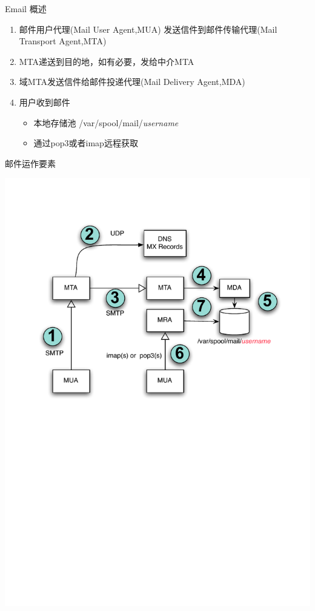 \begin{frame}{Email 概述}
\begin{enumerate}
\item 邮件用户代理(Mail User Agent,MUA) 发送信件到邮件传输代理(Mail Transport Agent,MTA)
\item MTA递送到目的地，如有必要，发给中介MTA
\item 域MTA发送信件给邮件投递代理(Mail Delivery Agent,MDA)
\item 用户收到邮件

\begin{itemize}
\item 本地存储池 /var/spool/mail/\emph{username}
\item 通过pop3或者imap远程获取
\end{itemize}
\end{enumerate}

\end{frame} 
\begin{frame}{邮件运作要素}

\includegraphics[scale=.8]{images/email-overview}


\end{frame} 
